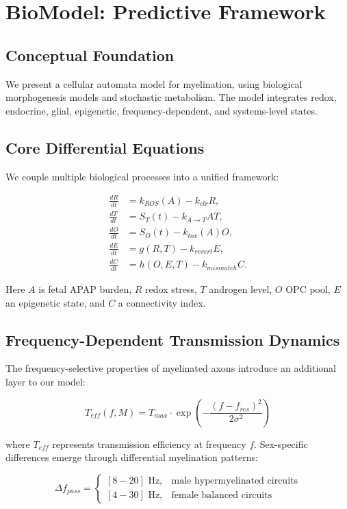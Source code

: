 \documentclass[12pt]{article}
\begin{document}
\section{BioModel: Predictive Framework}

\subsection{Conceptual Foundation}
We present a cellular automata model for myelination, using biological morphogenesis models and stochastic metabolism. The model integrates redox, endocrine, glial, epigenetic, frequency-dependent, and systems-level states.

\subsection{Core Differential Equations}
We couple multiple biological processes into a unified framework:

\begin{align}
\frac{dR}{dt} &= k_{ROS}(A) - k_{clr}R, \\
\frac{dT}{dt} &= S_T(t) - k_{A \rightarrow T}AT, \\
\frac{dO}{dt} &= S_O(t) - k_{tox}(A)O, \\
\frac{dE}{dt} &= g(R,T) - k_{revert}E, \\
\frac{dC}{dt} &= h(O,E,T) - k_{mismatch}C.
\end{align}

Here $A$ is fetal APAP burden, $R$ redox stress, $T$ androgen level, $O$ OPC pool, $E$ an epigenetic state, and $C$ a connectivity index.

\subsection{Frequency-Dependent Transmission Dynamics}
The frequency-selective properties of myelinated axons introduce an additional layer to our model:

\begin{equation}
T_{eff}(f,M) = T_{max} \cdot \exp\left(-\frac{(f-f_{res})^2}{2\sigma^2}\right)
\end{equation}

where $T_{eff}$ represents transmission efficiency at frequency $f$. Sex-specific differences emerge through differential myelination patterns:

\begin{equation}
\Delta f_{pass} = \begin{cases}
[8-20] \text{ Hz}, & \text{male hypermyelinated circuits} \\
[4-30] \text{ Hz}, & \text{female balanced circuits}
\end{cases}
\end{equation}
\end{document}
